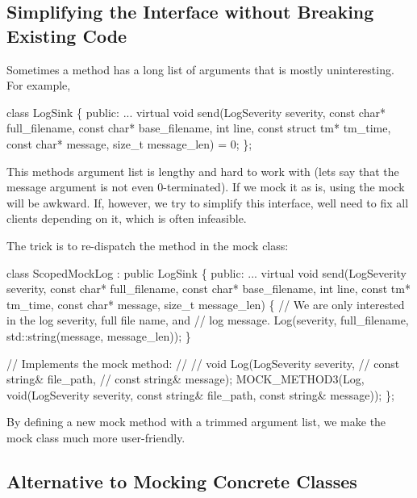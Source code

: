 \subsection*{Simplifying the Interface without Breaking Existing Code}

Sometimes a method has a long list of arguments that is mostly uninteresting. For example,


\begin{DoxyCode}
class LogSink \{
 public:
  ...
  virtual void send(LogSeverity severity, const char* full\_filename,
                    const char* base\_filename, int line,
                    const struct tm* tm\_time,
                    const char* message, size\_t message\_len) = 0;
\};
\end{DoxyCode}


This method\textquotesingle{}s argument list is lengthy and hard to work with (let\textquotesingle{}s say that the {\ttfamily message} argument is not even 0-\/terminated). If we mock it as is, using the mock will be awkward. If, however, we try to simplify this interface, we\textquotesingle{}ll need to fix all clients depending on it, which is often infeasible.

The trick is to re-\/dispatch the method in the mock class\+:


\begin{DoxyCode}
class ScopedMockLog : public LogSink \{
 public:
  ...
  virtual void send(LogSeverity severity, const char* full\_filename,
                    const char* base\_filename, int line, const tm* tm\_time,
                    const char* message, size\_t message\_len) \{
    // We are only interested in the log severity, full file name, and
    // log message.
    Log(severity, full\_filename, std::string(message, message\_len));
  \}

  // Implements the mock method:
  //
  //   void Log(LogSeverity severity,
  //            const string& file\_path,
  //            const string& message);
  MOCK\_METHOD3(Log, void(LogSeverity severity, const string& file\_path,
                         const string& message));
\};
\end{DoxyCode}


By defining a new mock method with a trimmed argument list, we make the mock class much more user-\/friendly.

\subsection*{Alternative to Mocking Concrete Classes}

